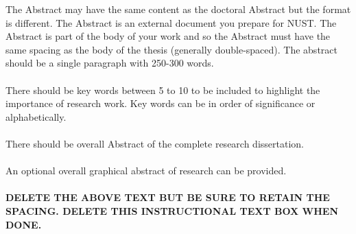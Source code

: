 \documentclass[a4paper,12pt,one side]{report}
\theoremstyle{definition}
\begin{document}
\begin{tcolorbox}[enhanced jigsaw,
    sharp corners,
    boxrule=0.5pt, 
    colback=blue!30!white,   
    borderline={0.5pt}{-2pt}{black,solid} %
 ]
 \begin{justify}
 The Abstract may have the same content as the doctoral Abstract but the format is different. The Abstract is an external document you prepare for NUST. The Abstract is part of the body of your work and so the Abstract must have the same spacing as the body of the thesis (generally double-spaced). The abstract should be a single paragraph with 250-300 words.\\~\\
There should be key words between 5 to 10 to be included to highlight the importance of research work. Key words can be in order of significance or alphabetically.\\~\\
There should be overall Abstract of the complete research dissertation.\\~\\ 
An optional overall graphical abstract of research can be provided.\\~\\
\bf{DELETE THE ABOVE TEXT BUT BE SURE TO RETAIN THE SPACING.}
{\bf DELETE THIS INSTRUCTIONAL TEXT BOX WHEN DONE.}
\end{justify}
\end{tcolorbox}

\pagebreak
{}
\end{document}
